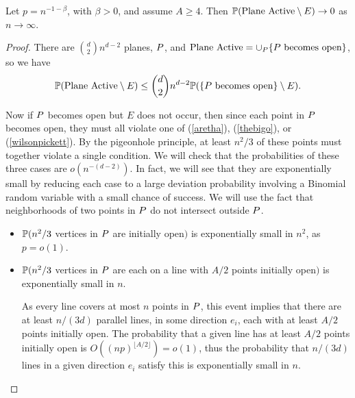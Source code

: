 \begin{lemma} \label{activenotE}
Let $p = n^{-1-\beta}$, with $\beta > 0$, and assume $A\ge 4$. 
Then $\mathbb{P}(\text{Plane Active} \setminus E) \to 0$ as $n \to \infty$.
\end{lemma}
\begin{proof}
There are ${d \choose 2}n^{d-2}$ planes, $P$, and
$\text{Plane Active} = \cup_P \{\hbox{$P$ becomes open}\}$,
so we have
$$\mathbb{P}(\text{Plane Active} \setminus E) \le {d \choose 2}n^{d-2} \mathbb{P}(\{{P}\text{ becomes open}\}\setminus E).$$

Now if $P$ becomes open but $E$ does not occur, then since each point in $P$ becomes open, they must all violate one of (\ref{aretha}), (\ref{thebigo}), or (\ref{wilsonpickett}). By the pigeonhole principle, at least $n^2/3$ of these points must together violate a single condition. We will check that the probabilities of these three cases are $o(n^{-(d-2)})$. In fact, we will see
that they are exponentially small by reducing each case to a large deviation probability 
involving a Binomial random variable with a small chance of success. We will use
the fact that neighborhoods of two points in $P$ do not intersect outside $P$. 

\begin{itemize}
\item $\mathbb{P}(n^2/3$ vertices in $P$ are initially open$)$ is exponentially small 
in $n^2$, as $p=o(1)$.  

\item $\mathbb{P}(n^2/3$ vertices in $P$ are each on a line with $A/2$ points initially open$)$
is exponentially small in $n$. 

As every line covers at most $n$ points in $P$, this event implies that there 
are at least $n/(3d)$ parallel lines, in some direction $e_i$,  
each with at least $A/2$ points initially open.  
The probability that a given line has at least $A/2$ points initially 
open is $O((np)^{\lfloor A/2\rfloor})=o(1)$, thus the probability that $n/(3d)$ lines in a given direction 
$e_i$ satisfy this is exponentially small in $n$.

\begin{comment}
 The probability of this is at most
$$2{n \choose n/6}\left({n \choose A/2}p^{A/2}\right)^{n/6}\leq 
2\cdot 2^n\left(n^{-\beta A/2}\right)^{n/6}\leq 2\cdot 2^n n^{-n/6}
=o\left(n^{-(d-2)}\right) .$$
\end{comment}


\end{itemize}
\end{proof}
